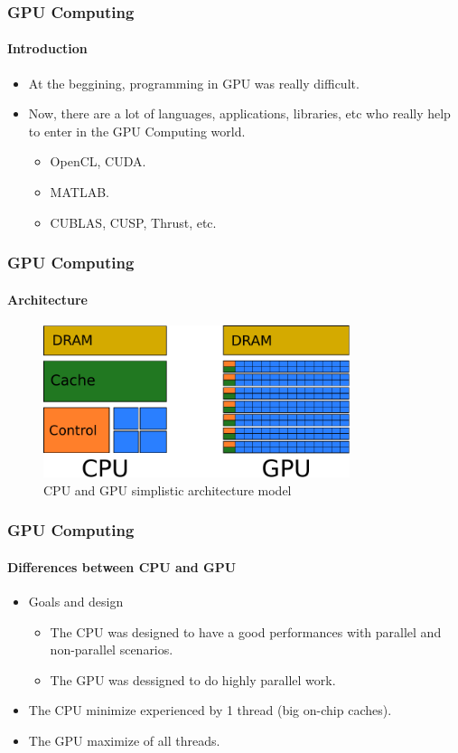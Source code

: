 \begin{frame}
    \frametitle{GPU Computing}
    \framesubtitle{Introduction}
    \begin{itemize}
        \item At the beggining, programming in GPU was really difficult.
        \item Now, there are a lot of languages, applications, libraries, etc
            who really help to enter in the GPU Computing world.
        \begin{itemize}
            \item OpenCL, CUDA.
            \item MATLAB.
            \item CUBLAS, CUSP, Thrust, etc.
        \end{itemize}
    \end{itemize}
\end{frame}

\begin{frame}
    \frametitle{GPU Computing}
    \framesubtitle{Architecture}
    \begin{figure}
        \centering
        \label{fig:architecture}
        \includegraphics[width=0.8\textwidth]{img/architecture.pdf}
        \caption{CPU and GPU simplistic architecture model}
    \end{figure}
\end{frame}

\begin{frame}
    \frametitle{GPU Computing}
    \framesubtitle{Differences between CPU and GPU}
    \begin{itemize}
        \item Goals and design
        \begin{itemize}
            \item The CPU was designed to have a good performances with parallel and non-parallel
                  scenarios.
            \item The GPU was dessigned to do highly parallel work.
        \end{itemize}
        \item The CPU minimize  experienced by 1 thread (big on-chip caches).
        \item The GPU maximize  of all threads.
    \end{itemize}
\end{frame}
